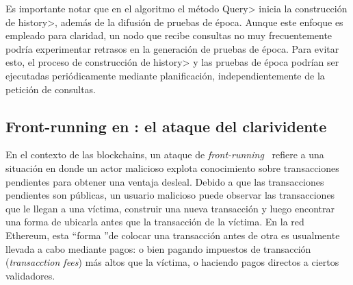 Es importante notar que en el algoritmo el método \<Query> inicia la construcción de \<history>, además de
la difusión de pruebas de época.
%
Aunque este enfoque es empleado para claridad, un nodo que recibe consultas
no muy frecuentemente podría experimentar retrasos en la generación de pruebas de época.
%
Para evitar esto, el proceso de construcción de \<history> y las pruebas de época podrían ser ejecutadas
periódicamente mediante planificación, independientemente de la petición de consultas.



%

\subsection{Front-running en \hashchain: el ataque del clarividente}
En el contexto de las blockchains, un ataque de \textit{front-running}~\cite{frontrunning} refiere a una situación en donde
un actor malicioso explota conocimiento sobre transacciones pendientes para obtener una ventaja
desleal. Debido a que las transacciones pendientes son públicas, un usuario malicioso puede
observar las transacciones que le llegan a una víctima, construir una nueva transacción y luego
encontrar una forma de ubicarla antes que la transacción de la víctima. En la red Ethereum, esta
\textquotedblleft forma \textquotedblright de colocar una transacción antes de otra es usualmente
llevada a cabo mediante pagos: o bien pagando impuestos de transacción (\textit{transacction fees}) más altos
que la víctima, o haciendo pagos directos a ciertos validadores.
%

